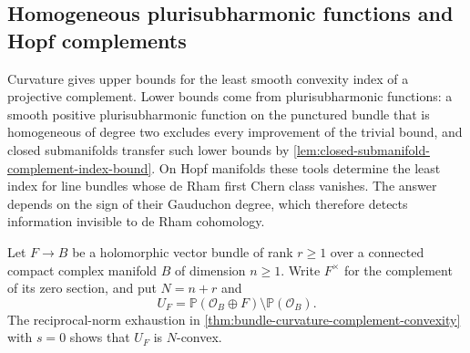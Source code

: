 \subsection{Homogeneous plurisubharmonic functions and Hopf complements}
\label{subsec:flat-restriction-hopf-complements}

Curvature gives upper bounds for the least smooth convexity index of a projective complement. Lower bounds come from plurisubharmonic functions: a smooth positive plurisubharmonic function on the punctured bundle that is homogeneous of degree two excludes every improvement of the trivial bound, and closed submanifolds transfer such lower bounds by \cref{lem:closed-submanifold-complement-index-bound}. On Hopf manifolds these tools determine the least index for line bundles whose de Rham first Chern class vanishes. The answer depends on the sign of their Gauduchon degree, which therefore detects information invisible to de Rham cohomology.

Let $F\to B$ be a holomorphic vector bundle of rank $r\geq1$ over a connected compact complex manifold $B$ of dimension $n\geq1$. Write $F^\times$ for the complement of its zero section, and put $N=n+r$ and
\[
 U_F=\mathbb P(\mathcal O_B\oplus F)\setminus\mathbb P(\mathcal O_B).
\]
The reciprocal-norm exhaustion in \cref{thm:bundle-curvature-complement-convexity} with $s=0$ shows that $U_F$ is $N$-convex.

